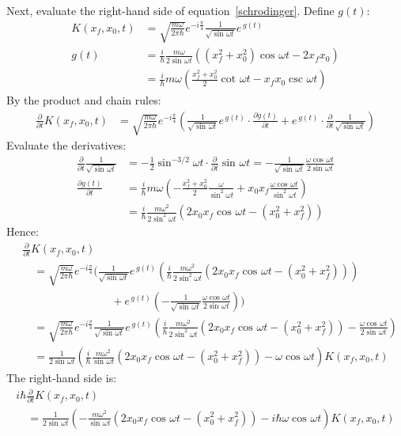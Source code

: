 \documentclass[a4paper]{extarticle}
\newcommand{\half}{\frac{1}{2}}
\newcommand{\ihbar}{\frac{i}{\hbar}}
\newcommand{\w}{\omega}
\newcommand{\sinwt}[1][]{\sin^{#1}\omega t}
\newcommand{\coswt}[1][]{\cos^{#1}\omega t}
\newcommand{\cotwt}[1][]{\cot^{#1}\omega t}
\newcommand{\cscwt}[1][]{\csc^{#1}\omega t}
\newcommand{\del}[2][]{\frac{\partial{#1}}{\partial{#2}}}
\newcommand{\propagator}{K(x_f, x_0, t)}
\begin{document}
Next, evaluate the right-hand side of equation~\ref{schrodinger}.
Define $g(t)$:
\begin{align*}
  \propagator
   & =
  \sqrt{\frac{m\w}{2\pi\hbar}} e^{-i\frac{\pi}{4}} \frac{1}{\sqrt{\sinwt}} e^{\,g(t)}
  \\[2ex]
  g(t)
   & =
  \ihbar\frac{m\w }{2\sinwt}\left((x_f^2 + x_0^2)\coswt - 2x_f x_0\right)
  \\[2ex]
   & =
  \ihbar m\w\left( \frac{x_f^2 + x_0^2}{2}\cotwt - x_f x_0\cscwt \right)
\end{align*}
By the product and chain rules:
\begin{align*}
  \del{t}\propagator
   & =
  \sqrt{\frac{m\w}{2\pi\hbar}} e^{-i\frac{\pi}{4}}
  \left(
  \frac{1}{\sqrt{\sinwt}} e^{\,g(t)}\cdot\del[g(t)]{t} +
  e^{\,g(t)}\cdot\del{t}\frac{1}{\sqrt{\sinwt}}
  \right)
\end{align*}
Evaluate the derivatives:
\begin{align*}
  \del{t}\frac{1}{\sqrt{\sinwt}}
   & =
  -\half\sinwt[-3/2]\cdot\del{t}\sinwt
  =
  -\frac{1}{\sqrt{\sinwt}}\frac{\w\coswt}{2\sinwt}
  \\[2ex]
  \del[g(t)]{t}
   & =
  \ihbar m\w \left(
  -\frac{x_f^2 + x_0^2}{2}\frac{\w}{\sinwt[2]} +
  x_0 x_f \frac{\w\coswt}{\sinwt[2]}
  \right)
  \\[2ex]
   & =
  \ihbar \frac{m\w^2}{2\sinwt[2]}\left(2x_0 x_f\coswt - (x_0^2 + x_f^2)\right)
\end{align*}
Hence:
\begin{align*}
   & \del{t}\propagator
  \\[2ex]
   & \quad =
  \sqrt{\frac{m\w}{2\pi\hbar}}
  e^{-i\frac{\pi}{4}}
  \Biggl(
  \frac{1}{\sqrt{\sinwt}}
  e^{\,g(t)}
  \left(
  \ihbar\frac{m\w^2}{2\sinwt[2]}\left(2x_0 x_f\coswt - (x_0^2 + x_f^2)\right)
  \right)
  \\
   & \qquad\qquad\qquad\qquad
  + e^{\,g(t)}
  \left(
  -\frac{1}{\sqrt{\sinwt}}\frac{\w\coswt}{2\sinwt}
  \right)
  \Biggr)
  \\[3ex]
   & \quad  =
  \sqrt{\frac{m\w}{2\pi\hbar}} e^{-i\frac{\pi}{4}} \frac{1}{\sqrt{\sinwt}} e^{\,g(t)}
  \left(
  \ihbar\frac{m\w^2}{2\sinwt[2]}\left(2x_0 x_f\coswt - (x_0^2 + x_f^2)\right) -
  \frac{\w\coswt}{2\sinwt}
  \right)
  \\[3ex]
   & \quad  =
  \frac{1}{2\sinwt}
  \left(
  \ihbar\frac{m\w^2}{\sinwt}\left(2x_0 x_f\coswt - (x_0^2 + x_f^2)\right) -
  \w\coswt
  \right)
  \propagator
\end{align*}
The right-hand side is:
\begin{multline}
  i\hbar\del{t}\propagator
  \\
  \label{rhs}
  \quad =
  \frac{1}{2\sinwt}
  \left(
  -\frac{m\w^2}{\sinwt}\left(2x_0 x_f\coswt - (x_0^2 + x_f^2)\right) -
  i\hbar\w\coswt
  \right)
  \propagator
\end{multline}
\end{document}
